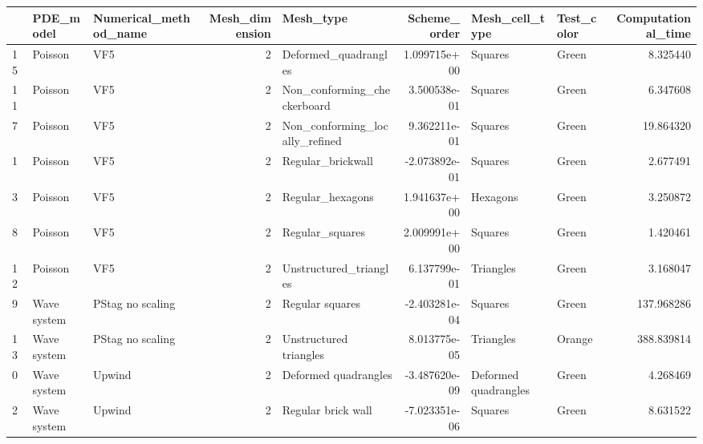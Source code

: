 \begin{tabular}{lllrlrllr}
\toprule
{} &    PDE\_model & Numerical\_method\_name &  Mesh\_dimension &                       Mesh\_type &  Scheme\_order &        Mesh\_cell\_type & Test\_color &  Computational\_time \\
\midrule
15 &      Poisson &                   VF5 &               2 &            Deformed\_quadrangles &  1.099715e+00 &               Squares &      Green &            8.325440 \\
11 &      Poisson &                   VF5 &               2 &     Non\_conforming\_checkerboard &  3.500538e-01 &               Squares &      Green &            6.347608 \\
7  &      Poisson &                   VF5 &               2 &  Non\_conforming\_locally\_refined &  9.362211e-01 &               Squares &      Green &           19.864320 \\
1  &      Poisson &                   VF5 &               2 &               Regular\_brickwall & -2.073892e-01 &               Squares &      Green &            2.677491 \\
3  &      Poisson &                   VF5 &               2 &                Regular\_hexagons &  1.941637e+00 &              Hexagons &      Green &            3.250872 \\
8  &      Poisson &                   VF5 &               2 &                 Regular\_squares &  2.009991e+00 &               Squares &      Green &            1.420461 \\
12 &      Poisson &                   VF5 &               2 &          Unstructured\_triangles &  6.137799e-01 &             Triangles &      Green &            3.168047 \\
9  &  Wave system &      PStag no scaling &               2 &                 Regular squares & -2.403281e-04 &               Squares &      Green &          137.968286 \\
13 &  Wave system &      PStag no scaling &               2 &          Unstructured triangles &  8.013775e-05 &             Triangles &     Orange &          388.839814 \\
0  &  Wave system &                Upwind &               2 &            Deformed quadrangles & -3.487620e-09 &  Deformed quadrangles &      Green &            4.268469 \\
2  &  Wave system &                Upwind &               2 &              Regular brick wall & -7.023351e-06 &               Squares &      Green &            8.631522 \\

\end{tabular}
